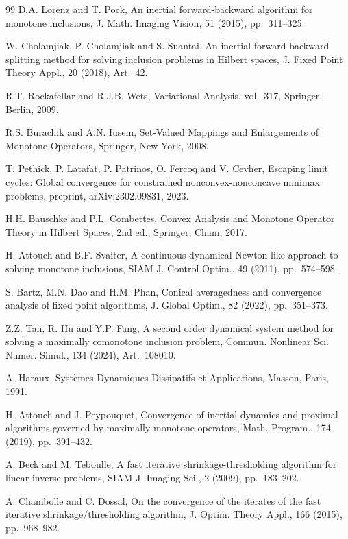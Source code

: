 \documentclass{article}
\theoremstyle{definition}
\theoremstyle{definition}
\theoremstyle{definition}
\begin{document}
\begin{thebibliography}{99}
 D.A. Lorenz and T. Pock, An inertial forward-backward algorithm for monotone inclusions, J. Math. Imaging Vision, 51 (2015), pp.~311--325.

 W. Cholamjiak, P. Cholamjiak and S. Suantai, An inertial forward-backward splitting method for solving inclusion problems in Hilbert spaces, J. Fixed Point Theory Appl., 20 (2018), Art.~42.

 R.T. Rockafellar and R.J.B. Wets, Variational Analysis, vol.~317, Springer, Berlin, 2009.

 R.S. Burachik and A.N. Iusem, Set-Valued Mappings and Enlargements of Monotone Operators, Springer, New York, 2008.

 T. Pethick, P. Latafat, P. Patrinos, O. Fercoq and V. Cevher, Escaping limit cycles: Global convergence for constrained nonconvex-nonconcave minimax problems, preprint, arXiv:2302.09831, 2023.

 H.H. Bauschke and P.L. Combettes, Convex Analysis and Monotone Operator Theory in Hilbert Spaces, 2nd ed., Springer, Cham, 2017.

 H. Attouch and B.F. Svaiter, A continuous dynamical Newton-like approach to solving monotone inclusions, SIAM J. Control Optim., 49 (2011), pp.~574--598.

 S. Bartz, M.N. Dao and H.M. Phan, Conical averagedness and convergence analysis of fixed point algorithms, J. Global Optim., 82 (2022), pp.~351--373.

 Z.Z. Tan, R. Hu and Y.P. Fang, A second order dynamical system method for solving a maximally comonotone inclusion problem, Commun. Nonlinear Sci. Numer. Simul., 134 (2024), Art.~108010.

 A. Haraux, Syst\`{e}mes Dynamiques Dissipatifs et Applications, Masson, Paris, 1991.

 H. Attouch and J. Peypouquet, Convergence of inertial dynamics and proximal algorithms governed by maximally monotone operators, Math. Program., 174 (2019), pp.~391--432.

 A. Beck and M. Teboulle, A fast iterative shrinkage-thresholding algorithm for linear inverse problems, SIAM J. Imaging Sci., 2 (2009), pp.~183--202.

 A. Chambolle and C. Dossal, On the convergence of the iterates of the fast iterative shrinkage/thresholding algorithm, J. Optim. Theory Appl., 166 (2015), pp.~968--982.


\end{thebibliography}
\end{document}
